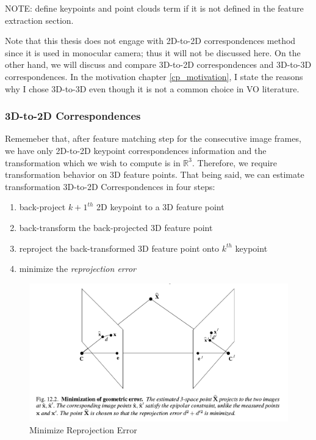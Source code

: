 \documentclass[a4paper]{report}
\numberwithin{figure}{section}
\newcommand{\R}{\mathbb{R}}
\begin{document}
NOTE: define keypoints and point clouds term if it is not defined in the feature extraction section.

Note that this thesis does not engage with 2D-to-2D correspondences method since it is 
used in monocular camera; thus it will not be discussed here. On the other hand, 
we will discuss and compare 3D-to-2D correspondences and 3D-to-3D correspondences. 
In the motivation chapter \ref{cp_motivation}, 
I state the reasons why I chose 3D-to-3D even though it is not a common choice 
in VO literature.


\subsubsection{3D-to-2D Correspondences}

Rememeber that,
after feature matching step for the consecutive image frames, we have only
2D-to-2D keypoint correspondences information and 
the transformation which we wish to compute is in $\R^3$. Therefore, we require 
transformation behavior on 3D feature points.
That being said, we can estimate transformation 3D-to-2D Correspondences in four steps:

\begin{enumerate}
  \item back-project $k+1^{th}$ 2D keypoint to a 3D feature point
  \item back-transform the back-projected 3D feature point
  \item reproject the back-transformed 3D feature point onto $k^{th}$ keypoint
  \item minimize the \textit{reprojection error}
\end{enumerate}

\begin{figure}[H]
	\centering
  \includegraphics[width=0.7\linewidth,natwidth=640,natheight=640]
  {fig/ref_imgs/min_euclidean_error.png}
  \caption{Minimize Reprojection Error}
	\label{fig:min_geometric_error}
\end{figure}
\end{document}
